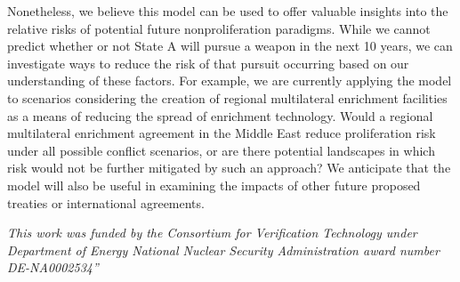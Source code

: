 Nonetheless, we believe this model can be used to offer valuable insights into the relative risks of potential future nonproliferation paradigms. While we cannot predict whether or not State A will pursue a weapon in the next 10 years, we can investigate ways to reduce the risk of that pursuit occurring based on our understanding of these factors. For example, we are currently applying the model to scenarios considering the creation of regional multilateral enrichment facilities as a means of reducing the spread of enrichment technology.  Would a regional multilateral enrichment agreement in the Middle East reduce proliferation risk under all possible conflict scenarios, or are there potential landscapes in which risk would not be further mitigated by such an approach?  We anticipate that the model will also be useful in examining the impacts of other future proposed treaties or international agreements.

\textit{This work was funded by the Consortium for Verification Technology under Department of Energy National Nuclear Security Administration award number DE-NA0002534”}

